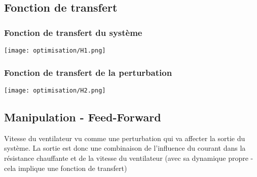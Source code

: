 \subsection{Fonction de transfert}
\subsubsection{Fonction de transfert du système}
\begin{center}\texttt{[image: optimisation/H1.png]}\end{center}
\subsubsection{Fonction de transfert de la perturbation}
\begin{center}\texttt{[image: optimisation/H2.png]}\end{center}

\subsection{Manipulation - Feed-Forward}
\label{FW}
Vitesse du ventilateur vu comme une perturbation  qui va affecter la sortie du système. La sortie est donc une combinaison de l'influence du courant dans la résistance chauffante et de la vitesse du ventilateur (avec sa dynamique propre - cela implique une fonction de transfert)\\

